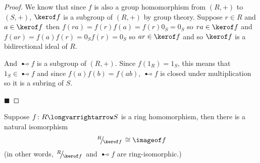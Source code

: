 \documentclass[10pt]{article}
\def\slfrac#1#2{\left.{}^{#1}\mkern-4mu\middle/\mkern-3mu{}_{#2}\right.}
\begin{document}
\begin{proof}

    We know that since $f$ is also a group homomorphism from $(R,+)$ to $(S,+)$, $\kerof f$ is a subgroup of $(R,+)$ by group theory.
    Suppose $r\in R$ and $a\in\kerof f$ then $f(ra)=f(r)f(a)=f(r)0_S=0_S$ so $ra\in\kerof f$ and $f(ar)=f(a)f(r)=0_Sf(r)=0_S$ so $ar\in\kerof f$ and so $\kerof f$ is a bidirectional ideal of $R$.

    And $\imageof f$ is a subgroup of $(R,+)$.
    Since $f(1_R)=1_S$, this means that $1_S\in\imageof f$ and since $f(a)f(b)=f(ab)$, $\imageof f$ is closed under multiplication so it is a subring of $S$.

    \hfill$\blacksquare$

\end{proof}

\begin{thrm*}

    Suppose $f\colon R\longvarrightarrow S$ is a ring homomorphism, then there is a natural isomorphism
    \[ \slfrac R{\kerof f}\cong\imageof f \]
    (in other words, $\slfrac R{\kerof f}$ and $\imageof f$ are ring-isomorphic.)

\end{thrm*}
\end{document}
